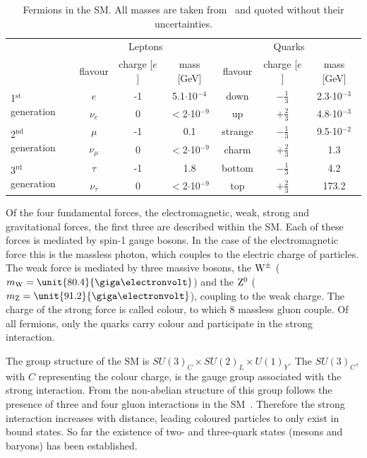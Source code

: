 \begin{table}
\centering
 \renewcommand{\arraystretch}{1.3}
\caption{Fermions in the SM. All masses are taken from~\cite{PDG} and quoted without their uncertainties.}
\label{tab:fermions}
\begin{tabular}{l|c c c | c c c }
  & \multicolumn{3}{c|}{Leptons} & \multicolumn{3}{c}{Quarks} \\
    & flavour & charge [$e$] & mass [GeV] & flavour & charge [$e$] & mass [GeV] \\
    \hline
  \multirow{2}{*}{1$^{\mathrm{st}}$ generation} & $e$ & -1 & 5.1$\cdot$10$^{\mathrm{-4}}$ &  down & $-\frac{1}{3}$ & 2.3$\cdot$10$^{-3}$ \\
 												& $\nu_e$ & 0 & $<$2$\cdot$10$^{\mathrm{-9}}$ &  up & $+\frac{2}{3}$ & 4.8$\cdot$10$^{-3}$  \\
 												\hline
  \multirow{2}{*}{2$^{\mathrm{nd}}$ generation} & $\mu$ & -1  & 0.1 & strange & $-\frac{1}{3}$ & 9.5$\cdot$10$^{-2}$ \\
 												& $\nu_{\mu}$ & 0 & $<$2$\cdot$10$^{\mathrm{-9}}$ & charm & $+\frac{2}{3}$ & 1.3 \\
 												\hline
  \multirow{2}{*}{3$^{\mathrm{rd}}$ generation} & $\tau$ & -1 & 1.8 & bottom & $-\frac{1}{3}$ & 4.2\\
 												& $\nu_{\tau}$ & 0 & $<$2$\cdot$10$^{\mathrm{-9}}$ & top & $+\frac{2}{3}$ & 173.2 \\ 												
 
 
\end{tabular}

\end{table}

Of the four fundamental forces, the electromagnetic, weak, strong and gravitational forces, the first three are described within the SM. Each of these forces is mediated by spin-1 gauge bosons. In the case of the electromagnetic force this is the massless photon, which couples to the electric charge of particles. The weak force is mediated by three massive bosons, the $\mathrm{W}^{\pm}$ ($m_{\W} = \unit{80.4}{\giga\electronvolt}$) and the $\mathrm{Z}^{0}$ ($m_{\mathrm{Z}} = \unit{91.2}{\giga\electronvolt}$), coupling to the weak charge. The charge of the strong force is called colour, to which 8 massless gluon couple. Of all fermions, only the quarks carry colour and participate in the strong interaction. 

The group structure of the SM is $SU(3)_C \times SU(2)_L \times U(1)_Y$. The $SU(3)_C$, with $C$ representing the colour charge, is the gauge group associated with the strong interaction. From the non-abelian structure of this group follows the presence of three and four gluon interactions in the SM~\cite{Pich:2007vu}. Therefore the strong interaction increases with distance, leading coloured particles to only exist in bound states. So far the existence of two- and three-quark states (mesons and baryons) has been established. 

